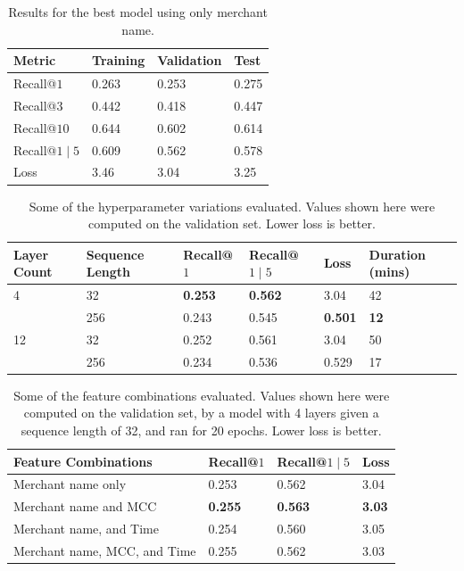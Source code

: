\documentclass{article}
\begin{document}
\begin{table}
  \caption{Results for the best model using only merchant name.}
  \label{training-table}
  \centering
  \begin{tabular}{l|ll|l}
    \toprule
    Metric &
    		Training &
    		Validation &
    		Test \\
    \midrule
    	Recall@$1$ & 0.263 & 0.253 & 0.275 \\
    	Recall@$3$ & 0.442 & 0.418 & 0.447 \\
    	Recall@$10$ & 0.644 & 0.602 & 0.614 \\
    	Recall@$1 \mid 5$ & 0.609 & 0.562 & 0.578 \\
    	Loss & 3.46 & 3.04 & 3.25 \\
    \bottomrule
  \end{tabular}
\end{table}

\begin{table}
  \caption{Some of the hyperparameter variations evaluated. Values shown here were computed on the validation set. Lower loss is better.}
  \label{hparams-table}
  \centering
  \begin{tabular}{ll|llll}
    \toprule
    Layer Count &
    		Sequence Length &
    		Recall@$1$ &
    		Recall@$1 \mid 5$ &
    		Loss &
    		Duration (mins)\\
    \midrule
    4 & 32 & \textbf{0.253} & \textbf{0.562} & 3.04 & 42  \\
     & 256 & 0.243 & 0.545 & \textbf{0.501} & \textbf{12} \\
    12 & 32 & 0.252 & 0.561 & 3.04 & 50  \\
     & 256 & 0.234 & 0.536 & 0.529 & 17 \\
    \bottomrule
  \end{tabular}
\end{table}

\begin{table}
  \caption{Some of the feature combinations evaluated. Values shown here were computed on the validation set, by a model with 4 layers given a sequence length of 32, and ran for 20 epochs. Lower loss is better.}
  \label{features-table}
  \centering
  \begin{tabular}{l|lll}
    \toprule
    Feature Combinations &
    		Recall@$1$ &
    		Recall@$1 \mid 5$ &
    		Loss \\
    \midrule
    Merchant name only & 0.253 & 0.562 & 3.04 \\
    Merchant name and MCC & \textbf{0.255} & \textbf{0.563} & \textbf{3.03} \\
    Merchant name, and Time & 0.254 & 0.560 & 3.05 \\
    Merchant name, MCC, and Time & 0.255 & 0.562 & 3.03 \\
    \bottomrule
  \end{tabular}
\end{table}
\end{document}
